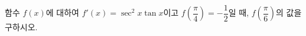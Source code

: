 함수 $f(x)$에 대하여 $f'(x)=\sec^2 x\tan x$이고 $f\!\left(\dfrac{\pi}{4}\right)=-\dfrac{1}{2}$일 때, $f\!\left(\dfrac{\pi}{6}\right)$의 값을 구하시오.
